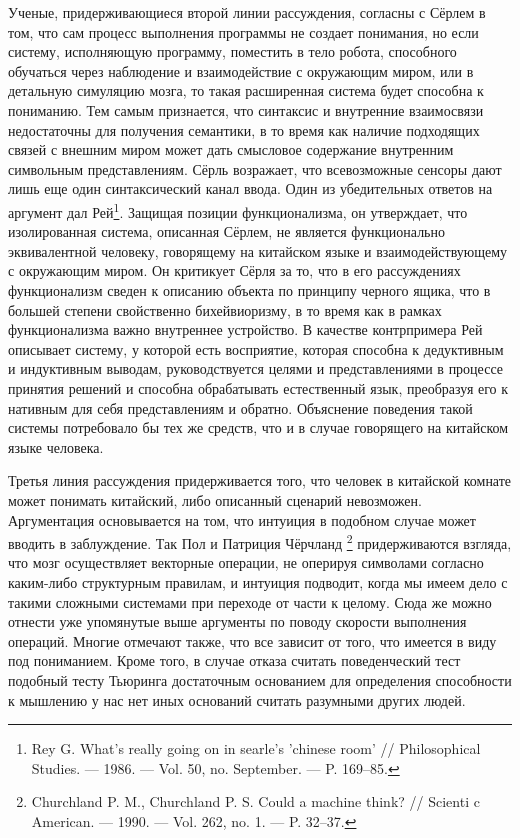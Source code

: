 \documentclass[12pt, specialist, subf, substylefile = spbu.rtx]{disser}
\begin{document}
Ученые, придерживающиеся второй линии рассуждения, согласны с Сёрлем в том, что сам процесс выполнения программы не создает понимания, но если систему, исполняющую программу, поместить в тело робота, способного обучаться через наблюдение и взаимодействие с окружающим миром, или в детальную симуляцию мозга, то такая расширенная система будет способна к пониманию. Тем самым признается, что синтаксис и внутренние взаимосвязи недостаточны для получения семантики, в то время как наличие подходящих связей с внешним миром может дать смысловое содержание внутренним символьным представлениям. Сёрль возражает, что всевозможные сенсоры дают лишь еще один синтаксический канал ввода. Один из убедительных ответов на аргумент дал Рей\footnote{\cite{Rey1986-REYWRG} Rey G. What’s really going on in searle’s ’chinese room’ // Philosophical Studies. — 1986. — Vol. 50, no. September. — P. 169–85.
}. Защищая позиции функционализма, он утверждает, что изолированная система, описанная Сёрлем, не является функционально эквивалентной человеку, говорящему на китайском языке и взаимодействующему с окружающим миром. Он критикует Сёрля за то, что в его рассуждениях функционализм сведен к описанию объекта по принципу черного ящика, что в большей степени свойственно бихейвиоризму, в то время как в рамках функционализма важно внутреннее устройство. В качестве контрпримера Рей описывает систему, у которой есть восприятие, которая способна к дедуктивным и индуктивным выводам, руководствуется целями и представлениями в процессе принятия решений и способна обрабатывать естественный язык, преобразуя его к нативным для себя представлениям и обратно. Объяснение поведения такой системы потребовало бы тех же средств, что и в случае говорящего на китайском языке человека. 

Третья линия рассуждения придерживается того, что человек в китайской комнате может понимать китайский, либо описанный сценарий невозможен. Аргументация основывается на том, что интуиция в подобном случае может вводить в заблуждение. Так Пол и Патриция Чёрчланд \footnote{\cite{Churchland1990-CHUCAM} Churchland P. M., Churchland P. S. Could a machine think? // Scienti c American. — 1990. — Vol. 262, no. 1. — P. 32–37.} придерживаются взгляда, что мозг осуществляет векторные операции, не оперируя символами согласно каким-либо структурным правилам, и интуиция подводит, когда мы имеем дело с такими сложными системами при переходе от части к целому. Сюда же можно отнести уже упомянутые выше аргументы по поводу скорости выполнения операций. Многие отмечают также, что все зависит от того, что имеется в виду под пониманием.  Кроме того, в случае отказа считать поведенческий тест подобный тесту Тьюринга достаточным основанием для определения способности к мышлению у нас нет иных оснований считать разумными других людей.
\end{document}
